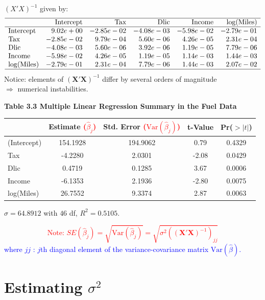 \documentclass[14pt]{extarticle}
\begin{document}
$(X'X)^{-1}$ given by:
\[
\begin{array}{l r r r r r}
\hline
 & \text{Intercept} & \text{Tax} & \text{Dlic} & \text{Income} & \log(\text{Miles}) \\
\hline
\text{Intercept} & 9.02e+00 & -2.85e-02 & -4.08e-03 & -5.98e-02 & -2.79e-01 \\
\text{Tax}       & -2.85e-02 & 9.79e-04 & 5.60e-06  & 4.26e-05  & 2.31e-04  \\
\text{Dlic}      & -4.08e-03 & 5.60e-06  & 3.92e-06  & 1.19e-05  & 7.79e-06  \\
\text{Income}    & -5.98e-02 & 4.26e-05  & 1.19e-05  & 1.14e-03  & 1.44e-03  \\
\log(\text{Miles}) & -2.79e-01 & 2.31e-04 & 7.79e-06  & 1.44e-03  & 2.07e-02  \\
\hline
\end{array}
\]
\noindent
Notice: elements of $(\mathbf{X}'\mathbf{X})^{-1}$ differ by several orders of magnitude \\
$\Rightarrow$ numerical instabilities.

\textbf{Table 3.3 Multiple Linear Regression Summary in the Fuel Data}
\begin{table}[H]
\centering
\begin{tabular}{l c c c c}
\hline
 & Estimate \textcolor{red}{($\hat{\beta}_j$)} & Std. Error \textcolor{red}{($\text{Var}(\hat{\beta}_j)$)} & t-Value & Pr($>|t|$) \\
\hline
(Intercept) & 154.1928 & 194.9062 & 0.79  & 0.4329 \\
Tax         & -4.2280  & 2.0301   & -2.08 & 0.0429 \\
Dlic        & 0.4719   & 0.1285   & 3.67  & 0.0006 \\
Income      & -6.1353  & 2.1936   & -2.80 & 0.0075 \\
log(Miles)  & 26.7552  & 9.3374   & 2.87  & 0.0063 \\
\hline
\end{tabular}
$\hat{\sigma} = 64.8912$ with $46$ df, $R^2 = 0.5105$.
\end{table}

\noindent
\textcolor{red}{
\[
\text{Note: } SE(\hat{\beta}_j) = \sqrt{\text{Var}(\hat{\beta}_j)} = \sqrt{\sigma^2 \left( (\mathbf{X}'\mathbf{X})^{-1} \right)_{jj}}
\]}
\textcolor{blue}{
where $jj$ : $j$th diagonal element of the variance-covariance matrix $\text{Var}(\hat{\beta})$.}

\section*{Estimating $\sigma^2$}
\end{document}
